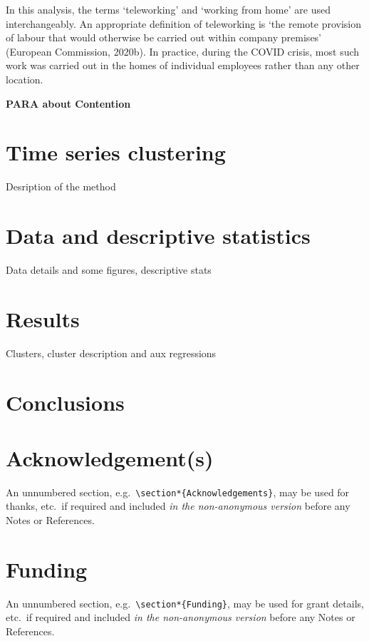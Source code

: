 \documentclass[]{interact}
\theoremstyle{plain}%
\theoremstyle{definition}
\theoremstyle{remark}
\begin{document}
In this analysis, the terms `teleworking' and `working from home' are
used interchangeably. An appropriate definition of teleworking is `the
remote provision of labour that would otherwise be carried out within
company premises' (European Commission, 2020b). In practice, during the
COVID crisis, most such work was carried out in the homes of individual
employees rather than any other location.

\textbf{PARA about Contention}

\hypertarget{time-series-clustering}{%
\section{Time series clustering}\label{time-series-clustering}}

Desription of the method

\hypertarget{data-and-descriptive-statistics}{%
\section{Data and descriptive
statistics}\label{data-and-descriptive-statistics}}

Data details and some figures, descriptive stats

\hypertarget{results}{%
\section{Results}\label{results}}

Clusters, cluster description and aux regressions

\hypertarget{conclusions}{%
\section{Conclusions}\label{conclusions}}

\hypertarget{acknowledgements}{%
\section*{Acknowledgement(s)}\label{acknowledgements}}

An unnumbered section,
e.g.~\texttt{\textbackslash{}section*\{Acknowledgements\}}, may be used
for thanks, etc.~if required and included \emph{in the non-anonymous
version} before any Notes or References.

\hypertarget{funding}{%
\section*{Funding}\label{funding}}

An unnumbered section,
e.g.~\texttt{\textbackslash{}section*\{Funding\}}, may be used for grant
details, etc.~if required and included \emph{in the non-anonymous
version} before any Notes or References.






\end{document}
